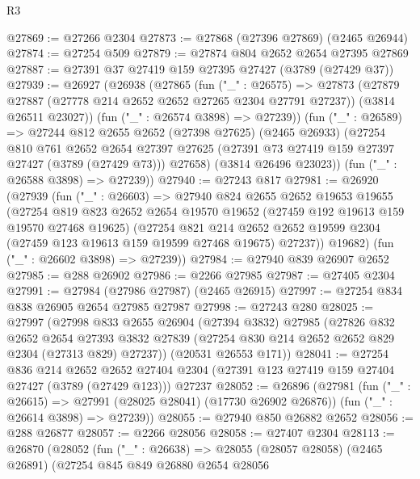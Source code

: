 \begin{lexlean}{R3}
\begin{coremodule}
@27869 := @27266 @2304
@27873 := @27868 (@27396 @27869) (@2465 @26944)
@27874 := @27254 @509
@27879 := @27874 @804 @2652 @2654 @27395 @27869
@27887 := @27391 @37 @27419 @159 @27395 @27427 (@3789 (@27429 @37))
@27939 := @26927
    (@26938
      (@27865
        (fun ("_" : @26575) =>
        @27873
          (@27879 @27887 (@27778 @214 @2652 @2652 @27265 @2304 @27791 @27237))
          (@3814 @26511 @23027))
        (fun ("_" : @26574 @3898) => @27239))
      (fun ("_" : @26589) =>
      @27244
        @812
        @2655
        @2652
        (@27398 @27625)
        (@2465 @26933)
        (@27254
          @810
          @761
          @2652
          @2654
          @27397
          @27625
          (@27391 @73 @27419 @159 @27397 @27427 (@3789 (@27429 @73)))
          @27658)
        (@3814 @26496 @23023))
      (fun ("_" : @26588 @3898) => @27239))
@27940 := @27243 @817
@27981 := @26920
    (@27939
      (fun ("_" : @26603) =>
      @27940
        @824
        @2655
        @2652
        @19653
        @19655
        (@27254
          @819
          @823
          @2652
          @2654
          @19570
          @19652
          (@27459 @192 @19613 @159 @19570 @27468 @19625)
          (@27254
            @821
            @214
            @2652
            @2652
            @19599
            @2304
            (@27459 @123 @19613 @159 @19599 @27468 @19675)
            @27237))
        @19682)
      (fun ("_" : @26602 @3898) => @27239))
@27984 := @27940 @839 @26907 @2652
@27985 := @288 @26902
@27986 := @2266 @27985
@27987 := @27405 @2304
@27991 := @27984 (@27986 @27987) (@2465 @26915)
@27997 := @27254 @834 @838 @26905 @2654 @27985 @27987
@27998 := @27243 @280
@28025 := @27997
    (@27998
      @833
      @2655
      @26904
      (@27394 @3832)
      @27985
      (@27826
        @832
        @2652
        @2654
        @27393
        @3832
        @27839
        (@27254 @830 @214 @2652 @2652 @829 @2304 (@27313 @829) @27237))
      (@20531 @26553 @171))
@28041 := @27254
    @836
    @214
    @2652
    @2652
    @27404
    @2304
    (@27391 @123 @27419 @159 @27404 @27427 (@3789 (@27429 @123)))
    @27237
@28052 := @26896
    (@27981
      (fun ("_" : @26615) => @27991 (@28025 @28041) (@17730 @26902 @26876))
      (fun ("_" : @26614 @3898) => @27239))
@28055 := @27940 @850 @26882 @2652
@28056 := @288 @26877
@28057 := @2266 @28056
@28058 := @27407 @2304
@28113 := @26870
    (@28052
      (fun ("_" : @26638) =>
      @28055
        (@28057 @28058)
        (@2465 @26891)
        (@27254
          @845
          @849
          @26880
          @2654
          @28056

\end{coremodule}
\end{lexlean}
